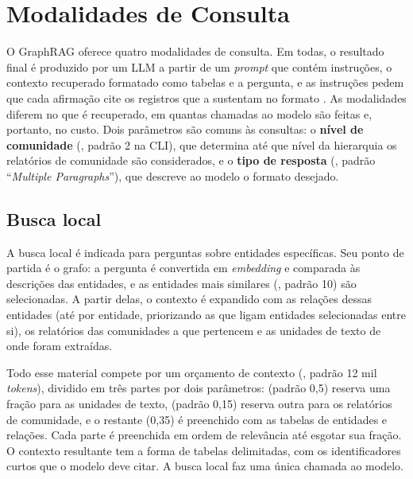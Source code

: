 \section{Modalidades de Consulta}
\label{sec-graphrag-consultas}

O GraphRAG oferece quatro modalidades de consulta. Em todas, o resultado final é produzido por um LLM a partir de um \textit{prompt} que contém instruções, o contexto recuperado formatado como tabelas e a pergunta, e as instruções pedem que cada afirmação cite os registros que a sustentam no formato . As modalidades diferem no que é recuperado, em quantas chamadas ao modelo são feitas e, portanto, no custo. Dois parâmetros são comuns às consultas: o \textbf{nível de comunidade} (, padrão 2 na CLI), que determina até que nível da hierarquia os relatórios de comunidade são considerados, e o \textbf{tipo de resposta} (, padrão ``\textit{Multiple Paragraphs}''), que descreve ao modelo o formato desejado.

\subsection{Busca local}
\label{sec-graphrag-consultas-local}

A busca local é indicada para perguntas sobre entidades específicas. Seu ponto de partida é o grafo: a pergunta é convertida em \textit{embedding} e comparada às descrições das entidades, e as entidades mais similares (, padrão 10) são selecionadas. A partir delas, o contexto é expandido com as relações dessas entidades (até  por entidade, priorizando as que ligam entidades selecionadas entre si), os relatórios das comunidades a que pertencem e as unidades de texto de onde foram extraídas.

Todo esse material compete por um orçamento de contexto (, padrão 12 mil \textit{tokens}), dividido em três partes por dois parâmetros:  (padrão 0,5) reserva uma fração para as unidades de texto,  (padrão 0,15) reserva outra para os relatórios de comunidade, e o restante (0,35) é preenchido com as tabelas de entidades e relações. Cada parte é preenchida em ordem de relevância até esgotar sua fração. O contexto resultante tem a forma de tabelas delimitadas, com os identificadores curtos que o modelo deve citar. A busca local faz uma única chamada ao modelo.

